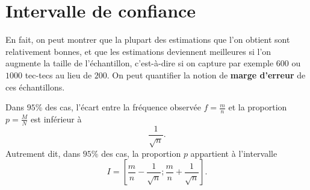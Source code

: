 \documentclass[11pt]{article}
\begin{document}
\section{Intervalle de confiance}

En fait, on peut montrer que la plupart des estimations que l'on obtient sont
relativement bonnes, et que les estimations deviennent meilleures si l'on
augmente la taille de l'échantillon, c'est-à-dire si on capture par exemple
$600$ ou $1000$ tec-tecs au lieu de $200$. On peut quantifier la notion de
\textbf{marge d'erreur} de ces échantillons.

\begin{prop}
  Dans $95$\% des cas, l'écart entre la fréquence observée $f=\frac{m}{n}$ et la
  proportion $p=\frac{M}{N}$ est inférieur à
  \[
    \frac{1}{\sqrt n}.
  \]
  Autrement dit, dans $95$\% des cas, la proportion $p$ appartient à l'intervalle 
  \[
    I = \left[ \frac{m}{n}-\frac{1}{\sqrt n}; \frac{m}{n}+\frac{1}{\sqrt n}
    \right].
  \]
\end{prop}
\end{document}
